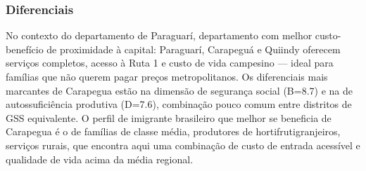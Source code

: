 \subsubsection*{Diferenciais}\label{dif-carapegua-0905}
No contexto do departamento de Paraguarí, departamento com melhor custo-benefício de proximidade à capital: Paraguarí, Carapeguá e Quiindy oferecem serviços completos, acesso à Ruta 1 e custo de vida campesino — ideal para famílias que não querem pagar preços metropolitanos. Os diferenciais mais marcantes de Carapegua estão na dimensão de segurança social (B=8.7) e na de autossuficiência produtiva (D=7.6), combinação pouco comum entre distritos de GSS equivalente. O perfil de imigrante brasileiro que melhor se beneficia de Carapegua é o de famílias de classe média, produtores de hortifrutigranjeiros, serviços rurais, que encontra aqui uma combinação de custo de entrada acessível e qualidade de vida acima da média regional.
